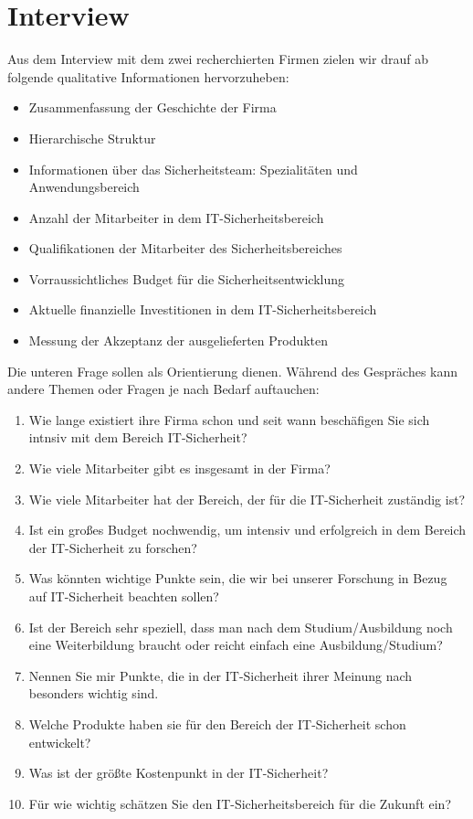 \section{Interview}\label{appendix:interview}

Aus dem Interview mit dem zwei recherchierten Firmen zielen wir drauf ab folgende qualitative Informationen hervorzuheben:

\begin{itemize}
    \item Zusammenfassung der Geschichte der Firma
    \item Hierarchische Struktur
    \item Informationen über das Sicherheitsteam: Spezialitäten und Anwendungsbereich
    \item Anzahl der Mitarbeiter in dem IT-Sicherheitsbereich
    \item Qualifikationen der Mitarbeiter des Sicherheitsbereiches
    \item Vorraussichtliches Budget für die Sicherheitsentwicklung
    \item Aktuelle finanzielle Investitionen in dem IT-Sicherheitsbereich
    \item Messung der Akzeptanz der ausgelieferten Produkten
\end{itemize}

Die unteren Frage sollen als Orientierung dienen. Während des Gespräches kann andere Themen oder Fragen je nach Bedarf
auftauchen:

\begin{enumerate}
    \item Wie lange existiert ihre Firma schon und seit wann beschäfigen Sie sich intnsiv mit dem Bereich IT-Sicherheit?
    \item Wie viele Mitarbeiter gibt es insgesamt in der Firma?
    \item Wie viele Mitarbeiter hat der Bereich, der für die IT-Sicherheit zuständig ist?
    \item Ist ein großes Budget nochwendig, um intensiv und erfolgreich in dem Bereich der IT-Sicherheit zu forschen?
    \item Was könnten wichtige Punkte sein, die wir bei unserer Forschung in Bezug auf IT-Sicherheit beachten sollen?
    \item Ist der Bereich sehr speziell, dass man nach dem Studium/Ausbildung noch eine Weiterbildung braucht oder reicht einfach eine Ausbildung/Studium?
    \item Nennen Sie mir Punkte, die in der IT-Sicherheit ihrer Meinung nach besonders wichtig sind.
    \item Welche Produkte haben sie für den Bereich der IT-Sicherheit schon entwickelt?
    \item Was ist der größte Kostenpunkt in der IT-Sicherheit?
    \item Für wie wichtig schätzen Sie den IT-Sicherheitsbereich für die Zukunft ein?
\end{enumerate}
